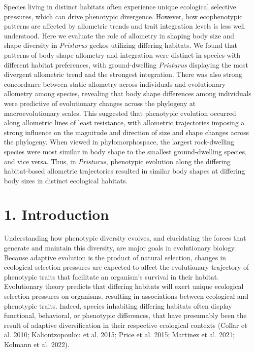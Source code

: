 \documentclass[
  11pt,
]{article}
\providecommand{\DIFaddtex}[1]{{\protect\color{blue}\uwave{#1}}} %
\providecommand{\DIFaddbegin}{} %
\providecommand{\DIFaddend}{} %
\providecommand{\DIFadd}[1]{\texorpdfstring{\DIFaddtex{#1}}{#1}} %
\newcommand{\DIFaddincludegraphics}[2][]{{\color{blue}\fbox{\DIFOincludegraphics[#1]{#2}}}} %
\DeclareRobustCommand{\DIFaddbegin}{\DIFOaddbegin \let\includegraphics\DIFaddincludegraphics} %
\DeclareRobustCommand{\DIFaddend}{\DIFOaddend \let\includegraphics\DIFOincludegraphics} %
\begin{document}
Species living in distinct habitats often experience unique ecological
selective pressures, which can drive phenotypic divergence. However, how
ecophenotypic patterns are affected by allometric trends and trait
integration levels is less well understood. Here we evaluate the role of
allometry in shaping body size and shape diversity in \emph{Pristurus}
geckos utilizing differing habitats. We found that patterns of
\DIFaddbegin \textbf{\DIFadd{CHANGE}} \DIFaddend body shape allometry and integration were distinct in
species with different habitat preferences, with ground-dwelling
\emph{Pristurus} displaying the most divergent allometric trend and the
strongest integration. There was also strong concordance between static
allometry across individuals and evolutionary allometry among species,
revealing that \DIFaddbegin \textbf{\DIFadd{CHANGE}}\DIFaddend body shape differences among individuals
were predictive of evolutionary changes across the phylogeny at
macroevolutionary scales. This suggested that phenotypic evolution
occurred along allometric lines of least resistance, with allometric
trajectories imposing a strong influence on the magnitude and direction
of size and shape changes across the phylogeny. When viewed in
phylomorphospace, the largest rock-dwelling species were most similar in
\DIFaddbegin \textbf{\DIFadd{CHANGE}}\DIFaddend body shape to the smallest ground-dwelling species, and
vice versa. Thus, in \emph{Pristurus}, phenotypic evolution along the
differing habitat-based allometric trajectories resulted in similar
\DIFaddbegin \textbf{\DIFadd{CHANGE}}\DIFaddend body shapes at differing body sizes in distinct
ecological habitats.

\newpage

\hypertarget{introduction}{%
\section{1. Introduction}\label{introduction}}

Understanding how phenotypic diversity evolves, and elucidating the
forces that generate and maintain this diversity, are major goals in
evolutionary biology. Because adaptive evolution is the product of
natural selection, changes in ecological selection pressures are
expected to affect the evolutionary trajectory of phenotypic traits that
facilitate an organism's survival in their habitat. Evolutionary theory
predicts that differing habitats will exert unique ecological selection
pressures on organisms, resulting in associations between ecological and
phenotypic traits. Indeed, species inhabiting differing habitats often
display functional, behavioral, or phenotypic differences, that have
presumably been the result of adaptive diversification in their
respective ecological contexts (Collar et al. 2010; Kaliontzopoulou et
al. 2015; Price et al. 2015; Martinez et al. 2021; Kolmann et al. 2022).
\hfill\break
\end{document}
